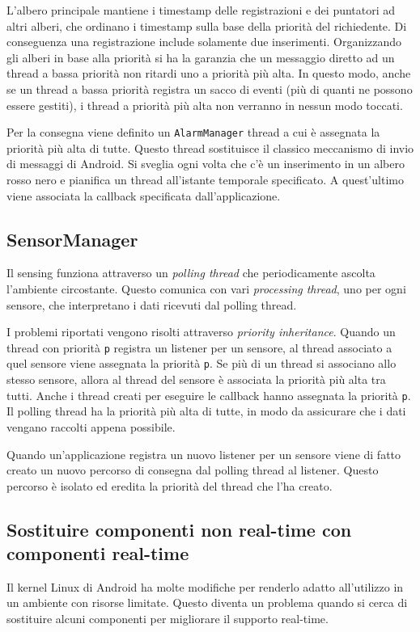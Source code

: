 L'albero principale mantiene i timestamp delle registrazioni e dei puntatori ad altri alberi, che ordinano i timestamp sulla base della priorità del richiedente. Di conseguenza una registrazione include solamente due inserimenti. Organizzando gli alberi in base alla priorità si ha la garanzia che un messaggio diretto ad un thread a bassa priorità non ritardi uno a priorità più alta. In questo modo, anche se un thread a bassa priorità registra un sacco di eventi (più di quanti ne possono essere gestiti), i thread a priorità più alta non verranno in nessun modo toccati.

Per la consegna viene definito un \texttt{AlarmManager} thread a cui è assegnata la priorità più alta di tutte. Questo thread sostituisce il classico meccanismo di invio di messaggi di Android. Si sveglia ogni volta che c'è un inserimento in un albero rosso nero e pianifica un thread all'istante temporale specificato. A quest'ultimo viene associata la callback specificata dall'applicazione.

\subsection{SensorManager}
Il sensing funziona attraverso un \textit{polling thread} che periodicamente ascolta l'ambiente circostante. Questo comunica con vari \textit{processing thread}, uno per ogni sensore, che interpretano i dati ricevuti dal polling thread.

I problemi riportati vengono risolti attraverso \textit{priority inheritance}. Quando un thread con priorità \texttt{p} registra un listener per un sensore, al thread associato a quel sensore viene assegnata la priorità \texttt{p}. Se più di un thread si associano allo stesso sensore, allora al thread del sensore è associata la priorità più alta tra tutti. Anche i thread creati per eseguire le callback hanno assegnata la priorità \texttt{p}. Il polling thread ha la priorità più alta di tutte, in modo da assicurare che i dati vengano raccolti appena possibile.

Quando un'applicazione registra un nuovo listener per un sensore viene di fatto creato un nuovo percorso di consegna dal polling thread al listener. Questo percorso è isolato ed eredita la priorità del thread che l'ha creato. 

\subsection{Sostituire componenti non real-time con componenti real-time}
Il kernel Linux di Android ha molte modifiche per renderlo adatto all'utilizzo in un ambiente con risorse limitate. Questo diventa un problema quando si cerca di sostituire alcuni componenti per migliorare il supporto real-time.

